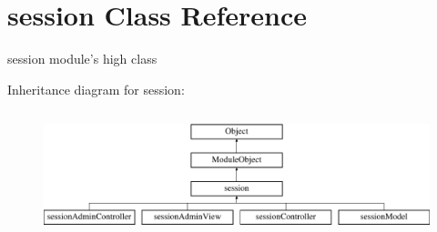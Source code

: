 \hypertarget{classsession}{\section{session Class Reference}
\label{classsession}
}


session module's high class  


Inheritance diagram for session\-:\begin{figure}[H]
\begin{center}
\leavevmode
\includegraphics[height=3.660131cm]{classsession}
\end{center}
\end{figure}

